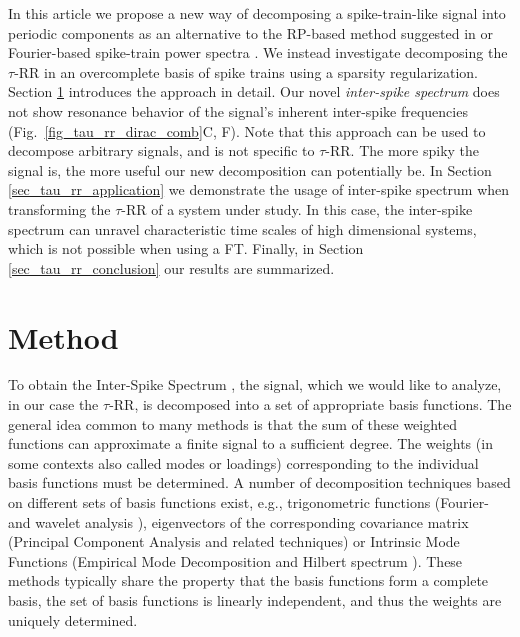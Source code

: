 \documentclass[entropy,article,submit,pdftex,moreauthors]{Definitions/mdpi}
\begin{document}
In this article we propose a new way of decomposing a spike-train-like signal into periodic components as 
an alternative to the RP-based method suggested in \cite{Zbilut2008} or Fourier-based spike-train power 
spectra \cite{Dummer2014}. We instead investigate decomposing the $\tau$-RR in an overcomplete basis of spike trains using a sparsity regularization. Section \ref{sec_tau_rr_method} introduces the approach in detail. Our novel \textit{inter-spike spectrum} does not show resonance 
behavior of the signal's inherent inter-spike frequencies (Fig.~\ref{fig_tau_rr_dirac_comb}C, F). Note that this approach can be used to decompose arbitrary signals, and is not specific to $\tau$-RR. The more spiky the signal is, the more useful our new decomposition can potentially be. In Section \ref{sec_tau_rr_application} we demonstrate the usage of inter-spike spectrum when transforming the $\tau$-RR of a system under study. In this case, the inter-spike spectrum 
can unravel characteristic time scales of high dimensional systems, which is not possible when using a FT. Finally, in Section \ref{sec_tau_rr_conclusion} our results are summarized.


\section{Method}\label{sec_tau_rr_method}
    
To obtain the Inter-Spike Spectrum , the signal, which we would like to analyze, in our case the $\tau$-RR, is decomposed into a set of appropriate basis functions. 
The general idea common to many methods is that the sum of these weighted functions can approximate a finite signal to a sufficient degree. The weights (in some contexts also called modes or loadings) corresponding to the individual basis functions must be determined.
A number of decomposition techniques based on different sets of basis functions exist, e.g., 
trigonometric functions (Fourier- and wavelet analysis \cite{Bracewell1986}), 
eigenvectors of the corresponding covariance matrix (Principal Component Analysis \cite{Hotelling1933} and related techniques) 
or Intrinsic Mode Functions (Empirical Mode Decomposition and Hilbert spectrum \cite{Norden1998}).
These methods typically share the property that the basis functions form a complete basis,
the set of basis functions is linearly independent, and thus the weights are uniquely determined.
\end{document}
